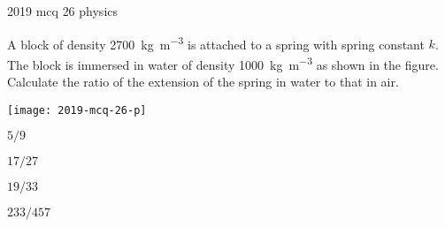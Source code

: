 \ylDisplay
{}%
{2019}%
{mcq}%
{26}%
{physics}%
{}%
{
\ifStatement
A block of density \SI{2700}{\kg\per\m\cubed} is attached to a spring with spring constant $k$. The block is immersed in water of density \SI{1000}{\kg\per\m\cubed} as shown in the figure. Calculate the ratio of the extension of the spring in water to that in air.
\begin{center}
  \texttt{[image: 2019-mcq-26-p]}
\end{center}
\fi


$5/9$
\fi


$17/27$
\fi


$19/33$
\fi


$233/457$
\fi


\ifHint

\fi


\ifSolution

\fi


\ifEstStatement

\fi



\fi



\fi



\fi



\fi


\ifEstHint

\fi


\ifEstSolution

\fi
}
